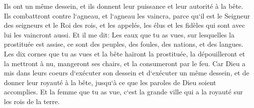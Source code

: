 \verse Ils ont un même dessein, et ils donnent leur puissance et leur autorité à la bête. 
\verse Ils combattront contre l`agneau, et l`agneau les vaincra, parce qu`il est le Seigneur des seigneurs et le Roi des rois, et les appelés, les élus et les fidèles qui sont avec lui les vaincront aussi. 
\verse Et il me dit: Les eaux que tu as vues, sur lesquelles la prostituée est assise, ce sont des peuples, des foules, des nations, et des langues. 
\verse Les dix cornes que tu as vues et la bête haïront la prostituée, la dépouilleront et la mettront à nu, mangeront ses chairs, et la consumeront par le feu. 
\verse Car Dieu a mis dans leurs coeurs d`exécuter son dessein et d`exécuter un même dessein, et de donner leur royauté à la bête, jusqu`à ce que les paroles de Dieu soient accomplies. 
\verse Et la femme que tu as vue, c`est la grande ville qui a la royauté sur les rois de la terre. 

